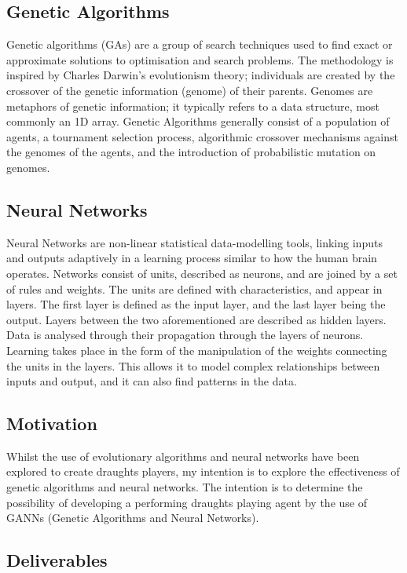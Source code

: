 \documentclass[12pt,a4paper]{article}
\begin{document}
\subsection*{Genetic Algorithms}

    Genetic algorithms (GAs) are a group of search techniques used to find exact or approximate solutions to optimisation and search problems. The methodology is inspired by Charles Darwin's evolutionism theory; individuals are created by the crossover of the genetic information (genome) of their parents. Genomes are metaphors of genetic information; it typically refers to a data structure, most commonly an 1D array. Genetic Algorithms generally consist of a population of agents, a tournament selection process, algorithmic crossover mechanisms against the genomes of the agents, and the introduction of probabilistic mutation on genomes. 

\subsection*{Neural Networks}

    Neural Networks are non-linear statistical data-modelling tools, linking inputs and outputs adaptively in a learning process similar to how the human brain operates. Networks consist of units, described as neurons, and are joined by a set of rules and weights. The units are defined with characteristics, and appear in layers. The first layer is defined as the input layer, and the last layer being the output. Layers between the two aforementioned are described as hidden layers. Data is analysed through their propagation through the layers of neurons. Learning takes place in the form of the manipulation of the weights connecting the units in the layers. This allows it to model complex relationships between inputs and output, and it can also find patterns in the data. 

\subsection*{Motivation}
    Whilst the use of evolutionary algorithms and neural networks have been explored to create draughts players, my intention is to explore the effectiveness of genetic algorithms and neural networks. The intention is to determine the possibility of developing a performing draughts playing agent by the use of GANNs (Genetic Algorithms and Neural Networks).

\subsection*{Deliverables}
\end{document}
